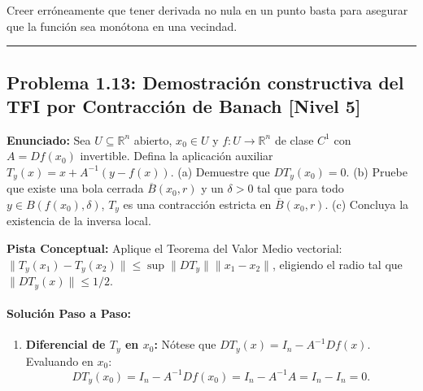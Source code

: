\documentclass[11pt,a4paper]{article}
\begin{document}
\begin{trapbox}
Creer erróneamente que tener derivada no nula en un punto basta para asegurar que la función sea monótona en una vecindad.
\end{trapbox}

\vspace{0.5cm}
\hrule
\vspace{0.5cm}

\subsection*{Problema 1.13: Demostración constructiva del TFI por Contracción de Banach \hfill \color{primaryblue}\small[Nivel 5]}

\begin{tcolorbox}[colback=white,colframe=gray!40,arc=1mm,boxrule=0.5pt,left=3mm,right=3mm,top=2mm,bottom=2mm]
\textbf{Enunciado:} Sea $U \subseteq \mathbb{R}^n$ abierto, $x_0 \in U$ y $f: U \to \mathbb{R}^n$ de clase $C^1$ con $A = Df(x_0)$ invertible. Defina la aplicación auxiliar $T_y(x) = x + A^{-1}(y - f(x))$. (a) Demuestre que $DT_y(x_0) = 0$. (b) Pruebe que existe una bola cerrada $\overline{B}(x_0, r)$ y un $\delta > 0$ tal que para todo $y \in B(f(x_0), \delta)$, $T_y$ es una contracción estricta en $\overline{B}(x_0, r)$. (c) Concluya la existencia de la inversa local.
\end{tcolorbox}

\begin{tcolorbox}[colback=yellow!4,colframe=accentamber!70,arc=1mm,boxrule=0.5pt,left=3mm,right=3mm,top=1.5mm,bottom=1.5mm]
\textbf{Pista Conceptual:} Aplique el Teorema del Valor Medio vectorial: $\|T_y(x_1) - T_y(x_2)\| \le \sup \|DT_y\| \|x_1 - x_2\|$, eligiendo el radio tal que $\|DT_y(x)\| \le 1/2$.
\end{tcolorbox}

\paragraph{Solución Paso a Paso:}\par
\begin{enumerate}[label=\textbf{\arabic*.}]
\item \textbf{Diferencial de $T_y$ en $x_0$:}
Nótese que $DT_y(x) = I_n - A^{-1} Df(x)$.
Evaluando en $x_0$:
\begin{equation*}
DT_y(x_0) = I_n - A^{-1} Df(x_0) = I_n - A^{-1}A = I_n - I_n = 0.
\end{equation*}
\end{enumerate}
\end{document}
